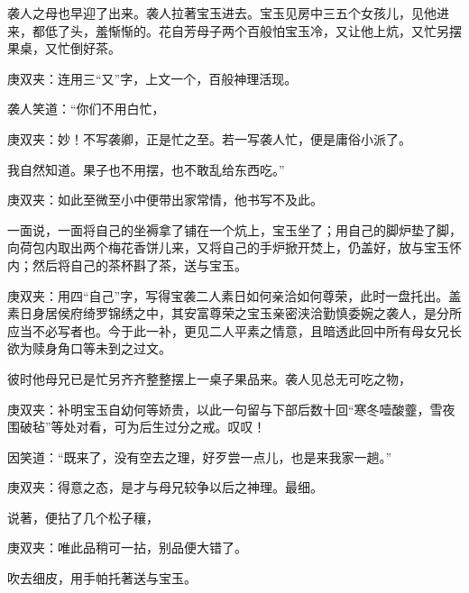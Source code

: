 \begin{parag}
    袭人之母也早迎了出来。袭人拉著宝玉进去。宝玉见房中三五个女孩儿，见他进来，都低了头，羞惭惭的。花自芳母子两个百般怕宝玉冷，又让他上炕，又忙另摆果桌，又忙倒好茶。\begin{note}庚双夹：连用三“又”字，上文一个，百般神理活现。\end{note}袭人笑道：“你们不用白忙，\begin{note}庚双夹：妙！不写袭卿，正是忙之至。若一写袭人忙，便是庸俗小派了。\end{note}我自然知道。果子也不用摆，也不敢乱给东西吃。”\begin{note}庚双夹：如此至微至小中便带出家常情，他书写不及此。\end{note}一面说，一面将自己的坐褥拿了铺在一个炕上，宝玉坐了；用自己的脚炉垫了脚，向荷包内取出两个梅花香饼儿来，又将自己的手炉掀开焚上，仍盖好，放与宝玉怀内；然后将自己的茶杯斟了茶，送与宝玉。\begin{note}庚双夹：用四“自己”字，写得宝袭二人素日如何亲洽如何尊荣，此时一盘托出。盖素日身居侯府绮罗锦绣之中，其安富尊荣之宝玉亲密浃洽勤慎委婉之袭人，是分所应当不必写者也。今于此一补，更见二人平素之情意，且暗透此回中所有母女兄长欲为赎身角口等未到之过文。\end{note}彼时他母兄已是忙另齐齐整整摆上一桌子果品来。袭人见总无可吃之物，\begin{note}庚双夹：补明宝玉自幼何等娇贵，以此一句留与下部后数十回“寒冬噎酸虀，雪夜围破毡”等处对看，可为后生过分之戒。叹叹！\end{note}因笑道：“既来了，没有空去之理，好歹尝一点儿，也是来我家一趟。”\begin{note}庚双夹：得意之态，是才与母兄较争以后之神理。最细。\end{note}说著，便拈了几个松子穰，\begin{note}庚双夹：唯此品稍可一拈，别品便大错了。\end{note}吹去细皮，用手帕托著送与宝玉。
\end{parag}


